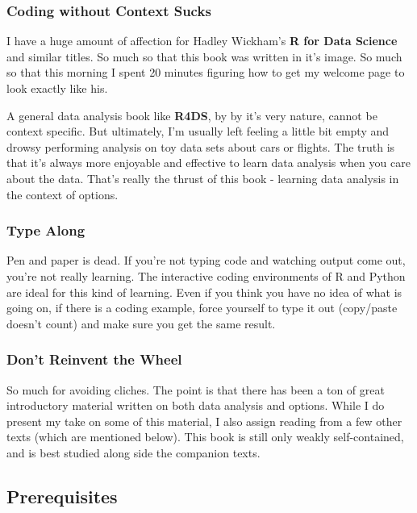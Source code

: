 \documentclass[11pt,]{krantz}
\begin{document}
\subsubsection*{Coding without Context Sucks}\label{coding-without-context-sucks}

I have a huge amount of affection for Hadley Wickham's \textbf{R for Data Science} and similar titles. So much so that this book was written in it's image. So much so that this morning I spent 20 minutes figuring how to get my welcome page to look exactly like his.

A general data analysis book like \textbf{R4DS}, by by it's very nature, cannot be context specific. But ultimately, I'm usually left feeling a little bit empty and drowsy performing analysis on toy data sets about cars or flights. The truth is that it's always more enjoyable and effective to learn data analysis when you care about the data. That's really the thrust of this book - learning data analysis in the context of options.

\subsubsection*{Type Along}\label{type-along}

Pen and paper is dead. If you're not typing code and watching output come out, you're not really learning. The interactive coding environments of R and Python are ideal for this kind of learning. Even if you think you have no idea of what is going on, if there is a coding example, force yourself to type it out (copy/paste doesn't count) and make sure you get the same result.

\subsubsection*{Don't Reinvent the Wheel}\label{dont-reinvent-the-wheel}

So much for avoiding cliches. The point is that there has been a ton of great introductory material written on both data analysis and options. While I do present my take on some of this material, I also assign reading from a few other texts (which are mentioned below). This book is still only weakly self-contained, and is best studied along side the companion texts.

\subsection{Prerequisites}\label{prerequisites}
\end{document}

